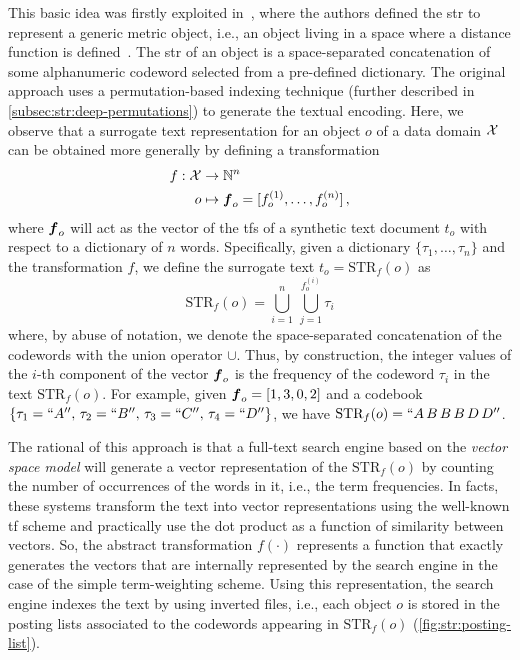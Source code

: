 This basic idea was firstly exploited in~\cite{gennaro2010approach}, where the authors defined the \acrfull{str} to represent a generic metric object, i.e., an object living in a space where a distance function is defined~\cite{zezula2006similarity}.
The \gls{str} of an object is a space-separated concatenation of some alphanumeric codeword selected from a pre-defined dictionary.
The original approach uses a permutation-based indexing technique (further described in \ref{subsec:str:deep-permutations}) to generate the textual encoding.
Here, we observe that a surrogate text representation for an object $o$ of a data domain $\mathcal{X}$ can be obtained more generally by defining a transformation
\begin{align}
	f : \mathcal{X} &\to \mathbb{N}^n\\
	o &\mapsto \boldsymbol {f}_o=[f_o^{(1)}, \dots, f_o^{(n)}] \,,
\end{align}
where $\boldsymbol {f}_o$ will act as the vector of the \glspl{tf} of a synthetic text document $t_o$ with respect to a dictionary of $n$ words.
Specifically, given a dictionary $\{\tau_1, \dots, \tau_n\}$ and the transformation $f$, we define the surrogate text $ t_o=\text{STR}_f(o)$ as
\begin{equation}
	\text{STR}_f(o)=\bigcup_{i=1}^n\,\bigcup_{j=1}^{f_o^{(i)}} \tau_i
\end{equation}
where, by abuse of notation, we denote the space-separated concatenation of the codewords with the union operator $\cup$.
Thus, by construction, the integer values of the $i$-th component of the vector $\boldsymbol {f}_o$ is the frequency of the codeword $\tau_i$ in the text $\text{STR}_f(o)$.
For example, given $\boldsymbol {f}_o=[1,3,0,2]$ and a codebook $\{\tau_1=``A'',\,  \tau_2=``B'',\, \tau_3=``C'', \,\tau_4=``D''\}$, we have $\text{STR}_f(o)=``A \, B \, B \, B \, D \, D''$.

The rational of this approach is that a full-text search engine based on the \emph{vector space model} \cite{salton1986introduction} will generate a vector representation of the $\text{STR}_f(o)$ by counting the number of occurrences of the words in it, i.e., the term frequencies.
In facts, these systems transform the text into vector representations using the well-known \gls{tf} scheme and practically use the dot product as a function of similarity between vectors.
So, the abstract transformation $f(\cdot)$ represents a function that exactly generates the vectors that are internally represented by the search engine in the case of the simple term-weighting scheme.
Using this representation, the search engine indexes the text by using inverted files, i.e., each object $o$ is stored in the posting lists associated to the codewords appearing in $\text{STR}_f(o)$ (\ref{fig:str:posting-list}).

